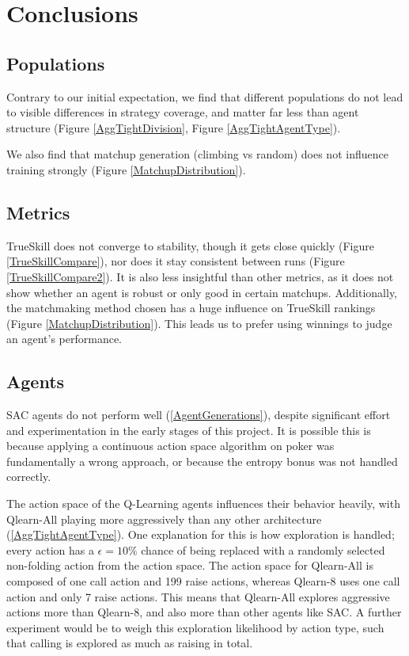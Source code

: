 \chapter{Conclusions}

\section{Populations}
Contrary to our initial expectation, we find that different populations do not lead to visible differences in strategy coverage, and matter far less than agent structure (Figure \ref{AggTightDivision}, Figure \ref{AggTightAgentType}).

We also find that matchup generation (climbing vs random) does not influence training strongly (Figure \ref{MatchupDistribution}).

\section{Metrics}
TrueSkill does not converge to stability, though it gets close quickly (Figure \ref{TrueSkillCompare}), nor does it stay consistent between runs (Figure \ref{TrueSkillCompare2}). It is also less insightful than other metrics, as it does not show whether an agent is robust or only good in certain matchups. 
Additionally, the matchmaking method chosen has a huge influence on TrueSkill rankings (Figure \ref{MatchupDistribution}). This leads us to prefer using winnings to judge an agent's performance.


\section{Agents}
SAC agents do not perform well (\ref{AgentGenerations}), despite significant effort and experimentation in the early stages of this project. It is possible this is because applying a continuous action space algorithm on poker was fundamentally a wrong approach, or because the entropy bonus was not handled correctly.


The action space of the Q-Learning agents influences their behavior heavily, with Qlearn-All playing more aggressively than any other architecture (\ref{AggTightAgentType}).
One explanation for this is how exploration is handled; every action has a $\epsilon = 10\%$ chance of being replaced with a randomly selected non-folding action from the action space. The action space for Qlearn-All is composed of one call action and 199 raise actions, whereas Qlearn-8 uses one call action and only 7  raise actions. This means that Qlearn-All explores aggressive actions more than Qlearn-8, and also more than other agents like SAC. A further experiment would be to weigh this exploration likelihood by action type, such that calling is explored as much as raising in total. 